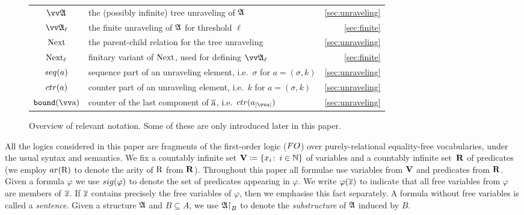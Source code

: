 \begin{figure}
\begin{tabularx}{\textwidth}{c X r}
    $\unravel{A}$ & the (possibly infinite) tree unraveling of ${\mathfrak{A}}$ & \cref{sec:unraveling} \\
    $\unravel{A}_{\ell}$ & the finite unraveling of ${\mathfrak{A}}$ for threshold $\ell$ & \cref{sec:finite} \\
    $\mathrm{Next}$ & the parent-child relation for the tree unraveling & \cref{sec:unraveling} \\
    $\mathrm{Next}_{\ell}$ & finitary variant of $\mathrm{Next}$, used for defining $\unravel{A}_{\ell}$ & \cref{sec:finite} \\
    $\seq{a}$ & sequence part of an unraveling element, i.e.\ $\sigma$ for $a = (\sigma, k)$ & \cref{sec:unraveling} \\
    $\ctr{a}$ & counter part of an unraveling element, i.e.\ $k$ for $a = (\sigma, k)$ & \cref{sec:unraveling} \\
    $\mathtt{bound}(\elemtuptuplea)$ & counter of the last component of $\overline{\mathrm{a}}$, i.e.\ $\ctr{a_{|\elemtuptuplea|}}$ & \cref{sec:unraveling} \\
  \end{tabularx}
  \egroup
  \caption{Overview of relevant notation. Some of these are only introduced later in this paper.}\label{fig:notation-quickref}
\end{figure}

All the logics considered in this paper are fragments of the first-order logic ($\FO$) over purely-relational equality-free vocabularies, under the usual syntax and semantics. 
We fix a countably infinite set $\mathbf{V} \coloneqq \{x_i \colon\, i \in {\mathbb{N}}\}$ of variables and a countably infinite set~$\mathbf{R}$ of predicates (we employ $\arity(\relR)$ to denote the arity of $\mathrm{R}$ from $\mathbf{R}$).
Throughout this paper all formulae use variables from $\mathbf{V}$ and predicates from $\mathbf{R}$.
Given a formula $\varphi$ we use $\sig(\varphi)$ to denote the set of predicates appearing in $\varphi$. 
We write $\varphi(\overline{\mathit{x}})$ to indicate that all free variables from $\varphi$ are members of $\overline{\mathit{x}}$. 
If $\overline{\mathit{x}}$ contains precisely the free
variables of $\varphi$, then we emphasise this fact separately.
A formula without free variables is called a \emph{sentence}.
Given a structure ${\mathfrak{A}}$ and $B \subseteq A$, we use ${\mathfrak{A}}\mathord{\upharpoonright}_{B}$ to denote the \emph{substructure} of ${\mathfrak{A}}$ induced by $B$.\\

